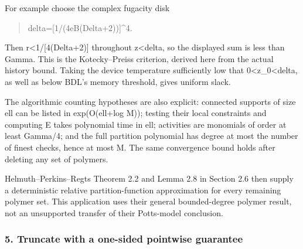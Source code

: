 \documentclass[
]{article}
\begin{document}
For example choose the complex fugacity disk

\begin{quote}\small\ttfamily\raggedright\setlength{\parskip}{0pt}
\noindent d\allowbreak{}e\allowbreak{}l\allowbreak{}t\allowbreak{}a\allowbreak{}\hspace*{0.525em}\allowbreak{}=\allowbreak{}\hspace*{0.525em}\allowbreak{}[\allowbreak{}1\allowbreak{}/\allowbreak{}(\allowbreak{}4\allowbreak{}\hspace*{0.525em}\allowbreak{}e\allowbreak{}\hspace*{0.525em}\allowbreak{}B\allowbreak{}\hspace*{0.525em}\allowbreak{}(\allowbreak{}D\allowbreak{}e\allowbreak{}l\allowbreak{}t\allowbreak{}a\allowbreak{}+\allowbreak{}2\allowbreak{})\allowbreak{})\allowbreak{}]\allowbreak{}\^{}\allowbreak{}4\allowbreak{}.\par
\end{quote}

Then
r\allowbreak{}<\allowbreak{}1\allowbreak{}/\allowbreak{}[\allowbreak{}4\allowbreak{}(\allowbreak{}D\allowbreak{}e\allowbreak{}l\allowbreak{}t\allowbreak{}a\allowbreak{}+\allowbreak{}2\allowbreak{})\allowbreak{}]
throughout \textbar z\textbar\textless delta, so the displayed sum is
less than \textbar Gamma\textbar. This is the Kotecky--Preiss criterion,
derived here from the actual history bound. Taking the device
temperature sufficiently low that 0\textless z\_0\textless delta, as
well as below BDL's memory threshold, gives uniform slack.

The algorithmic counting hypotheses are also explicit: connected
supports of size ell can be listed in exp(O(ell+log M)); testing their
local constraints and computing E takes polynomial time in ell;
activities are monomials of order at least \textbar Gamma\textbar/4; and
the full partition polynomial has degree at most the number of finest
checks, hence at most M. The same convergence bound holds after deleting
any set of polymers.

Helmuth--Perkins--Regts Theorem 2.2 and Lemma 2.8 in Section 2.6 then
supply a deterministic relative partition-function approximation for
every remaining polymer set. This application uses their general
bounded-degree polymer result, not an unsupported transfer of their
Potts-model conclusion.

\subsubsection{5. Truncate with a one-sided pointwise
guarantee}\label{truncate-with-a-one-sided-pointwise-guarantee}
\end{document}
